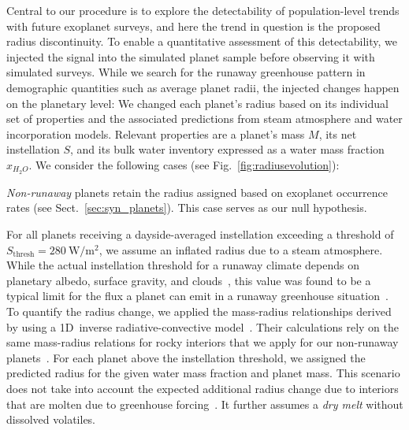 \documentclass[modern]{aastex631}
\begin{document}
Central to our procedure is to explore the detectability of population-level trends with future exoplanet surveys, and here the trend in question is the proposed radius discontinuity.
To enable a quantitative assessment of this detectability, we injected the signal into the simulated planet sample before observing it with simulated surveys.
While we search for the runaway greenhouse pattern in demographic quantities such as average planet radii, the injected changes happen on the planetary level: We changed each planet's radius based on its individual set of properties and the associated predictions from steam atmosphere and water incorporation models.
Relevant properties are a planet's mass $M$, its net instellation $S$, and its bulk water inventory expressed as a water mass fraction $x_{H_2O}$.
We consider the following cases (see Fig.~\ref{fig:radiusevolution}):


\textit{Non-runaway} planets retain the radius assigned based on exoplanet occurrence rates (see Sect.~\ref{sec:syn_planets}).
This case serves as our null hypothesis.

For all planets receiving a dayside-averaged instellation exceeding a threshold of $S_\mathrm{thresh} = \SI{280}{\watt\per\meter\squared}$, we assume an inflated radius due to a steam atmosphere.
While the actual instellation threshold for a runaway climate depends on planetary albedo, surface gravity, and clouds~\citep{Pierrehumbert2022}, this value was found to be a typical limit for the flux a planet can emit in a runaway greenhouse situation~\citep{Abe1988,Kasting1988,Nakajima1992,Goldblatt2013,Leconte2013,Boukrouche2021}.
To quantify the radius change, we applied the mass-radius relationships derived by \citet{Turbet2020} using a 1D~inverse radiative-convective model~\citep{Turbet2019}.
Their calculations rely on the same mass-radius relations for rocky interiors that we apply for our non-runaway planets~\citep{Zeng2016}.
For each planet above the instellation threshold, we assigned the predicted radius for the given water mass fraction and planet mass.
This scenario does not take into account the expected additional radius change due to interiors that are molten due to greenhouse forcing~\citep{Bower2019}.
It further assumes a \textit{dry melt} without dissolved volatiles.
\end{document}
